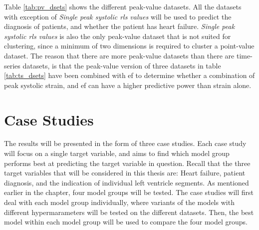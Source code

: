 Table \ref{tab:pv_dsets} shows the different peak-value datasets. 
All the datasets with exception of \textit{Single peak systolic \acrshort{rls} values} will be used to predict the diagnosis of patients, 
and whether the patient has heart failure. \textit{Single peak systolic \acrshort{rls} values} is also the only peak-value dataset that is not suited for clustering, 
since a minimum of two dimensions is required to cluster a point-value dataset. The reason that there are more peak-value datasets than there are time-series datasets, 
is that the peak-value version of three datasets in table \ref{tab:ts_dsets} have been combined with \acrshort{ef} to determine whether a combination of peak systolic strain,
and \acrshort{ef} can have a higher predictive power than strain alone.

\section{Case Studies}
The results will be presented in the form of three case studies. 
Each case study will focus on a single target variable, and aims to find which model group performs best at predicting the target variable in question.
Recall that the three target variables that will be considered in this thesis are: Heart failure, patient diagnosis, and the indication of individual left ventricle segments.
As mentioned earlier in the chapter, four model groups will be tested. 
The case studies will first deal with each model group individually, where variants of the models with different hypermarameters will be tested on the different datasets. 
Then, the best model within each model group will be used to compare the four model groups.

